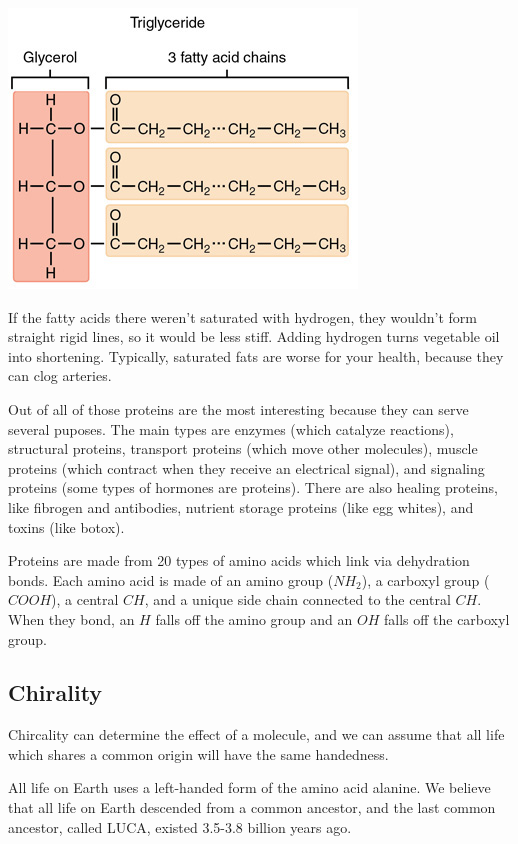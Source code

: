 \documentclass[class=article, crop=false]{standalone}
\begin{document}
\begin{center}
    \includegraphics[width=.6\textwidth]{triglycerides.jpg}
\end{center}
\begin{note}
    If the fatty acids there weren't saturated with hydrogen, they wouldn't form straight rigid lines, so it would be less stiff. Adding hydrogen turns vegetable oil into shortening. Typically, saturated fats are worse for your health, because they can clog arteries.
\end{note}
Out of all of those proteins are the most interesting because they can serve several puposes. The main types are enzymes (which catalyze reactions), structural proteins, transport proteins (which move other molecules), muscle proteins (which contract when they receive an electrical signal), and signaling proteins (some types of hormones are proteins). There are also healing proteins, like fibrogen and antibodies, nutrient storage proteins (like egg whites), and toxins (like botox).
\par
Proteins are made from 20 types of amino acids which link via dehydration bonds. Each amino acid is made of an amino group ($NH_2$), a carboxyl group ($COOH$), a central $CH$, and a unique side chain connected to the central $CH$. When they bond, an $H$ falls off the amino group and an $OH$ falls off the carboxyl group.
\subsection{Chirality}
Chircality can determine the effect of a molecule, and we can assume that all life which shares a common origin will have the same handedness.
\par
All life on Earth uses a left-handed form of the amino acid alanine. We believe that all life on Earth descended from a common ancestor, and the last common ancestor, called LUCA, existed 3.5-3.8 billion years ago.
\end{document}
